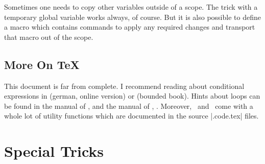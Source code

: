 Sometimes one needs to copy other variables outside of a scope. The trick with a temporary global variable works always, of course. But it is also possible to define a macro which contains commands to apply any required changes and transport that macro out of the scope.

\subsection{More On \TeX}
This document is far from complete. I recommend reading about conditional expressions in \cite{schwartz} (german, online version) or \cite{texbook} (bounded book). Hints about loops can be found in the manual of \PGFPlots, \cite{pgfplots} and the manual of \PGF, \cite{tikz}. Moreover, \PGFPlots\ and \PGF\ come with a whole lot of utility functions which are documented in the source |.code.tex| files.






\section{Special Tricks}

